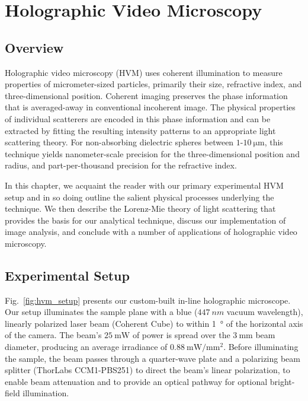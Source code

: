 \chapter{Holographic Video Microscopy}
\label{ch:hvm}

\newcommand{\einc}{\vec{E}_{\text{inc}}}
\newcommand{\escat}{\vec{E}_{\text{s}}}
\newcommand{\eadd}{\vec{E}_{\text{add}}}

\section{Overview}

Holographic video microscopy (HVM) uses coherent
illumination to measure properties of micrometer-sized particles,
primarily their size, refractive index, and three-dimensional position.
Coherent imaging preserves the phase information that is averaged-away
in conventional incoherent image. The physical properties of individual
scatterers are encoded in this phase information and can be extracted by fitting
the resulting intensity patterns to an appropriate light scattering theory.
For non-absorbing dielectric spheres between $\num{1}$-$\SI{10}{\um}$,
this technique yields nanometer-scale precision for the three-dimensional
position and radius, and part-per-thousand precision for the refractive
index\cite{krishnatreya14}.

In this chapter, we acquaint the reader with our primary experimental
HVM setup and in so doing outline the salient physical processes underlying
the technique. We then describe the Lorenz-Mie theory of light
scattering that provides the basis for our analytical technique,
discuss our implementation of image analysis, and 
conclude with a number of applications of holographic video
microscopy.

\section{Experimental Setup}
\label{ch:hvm:sec:hvm}

Fig.~\ref{fig:hvm_setup} presents our custom-built in-line holographic
microscope. Our setup illuminates the sample plane with a blue
($\SI{447}{nm}$ vacuum wavelength), linearly polarized laser beam
(Coherent Cube) to within \SI{1}{\degree} of the horizontal
axis of the camera. 
The beam's $\SI{25}{\mW}$ of power is spread over
the $\SI{3}{\mm}$ beam diameter, producing an average irradiance
of $\SI{0.88}{\mW / \mm^2}$. Before illuminating the sample, the beam
passes through a quarter-wave plate and a polarizing beam splitter
(ThorLabs CCM1-PBS251) to direct the beam's linear polarization, to
enable beam attenuation and to provide an optical pathway for
optional bright-field illumination.


